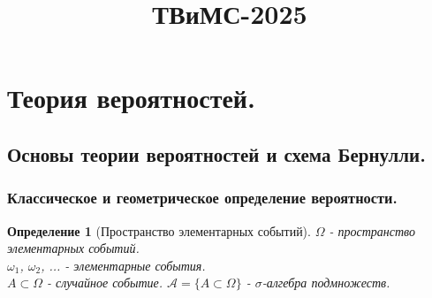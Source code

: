 \documentclass[14pt]{extarticle}
\title{ТВиМС-2025}
\theoremstyle{breakstyle}
\newtheorem{definition}{Определение}[subsection]
\begin{document}
\maketitle

\tableofcontents

\clearpage
\section{Теория вероятностей.}

\subsection{Основы теории вероятностей и схема Бернулли.}

\subsubsection{Классическое и геометрическое определение вероятности.}
\begin{definition}[Пространство элементарных событий]

$\Omega$ - пространство элементарных событий. \\
$\omega_1$, $\omega_2$, ... - элементарные события. \\
$A \subset \Omega$ - случайное событие.
$\mathscr{A} = \{A \subset \Omega\}$ - $\sigma$-алгебра подмножеств.

\end{definition}
\end{document}
